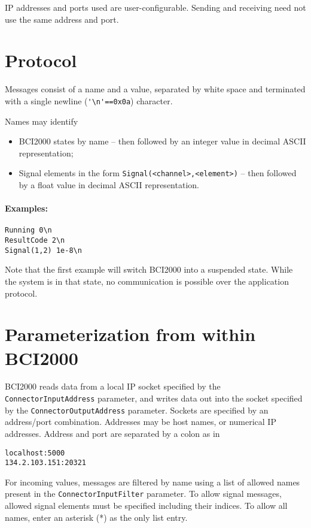 \documentclass[12pt,a4paper,notitlepage]{article}
\begin{document}
IP addresses and ports used are user-configurable. Sending and receiving need not use the same address and port.


\section{Protocol}

Messages consist of a name and a value, separated by white space
and terminated with a single newline (\verb|'\n'==0x0a|) character.

Names may identify
\begin{itemize}
\item BCI2000 states by name -- then followed
   by an integer value in decimal ASCII representation;
\item Signal elements in the form \texttt{Signal(<channel>,<element>)} --
   then followed by a float value in decimal ASCII representation.
\end{itemize}

\paragraph{Examples:}
\begin{verbatim}
Running 0\n
ResultCode 2\n
Signal(1,2) 1e-8\n
\end{verbatim}

Note that the first example will switch BCI2000 into a suspended state.
While the system is in that state, no communication is possible over the application protocol.

\section{Parameterization from within BCI2000}

BCI2000 reads data from a local IP socket specified by the 
\texttt{ConnectorInputAddress} parameter, and writes data out into the socket specified by the 
\texttt{ConnectorOutputAddress} parameter.
Sockets are specified by an address/port combination.
Addresses may be host names, or numerical IP addresses. Address and port are separated by
a colon as in
\begin{verbatim}
localhost:5000
134.2.103.151:20321
\end{verbatim}

For incoming values, messages are filtered by name using a list of allowed names 
present in the \texttt{ConnectorInputFilter} parameter. 
To allow signal messages, allowed signal elements must be specified including their
indices.
To allow all names, enter an asterisk (*) as the only list entry.
\end{document}
